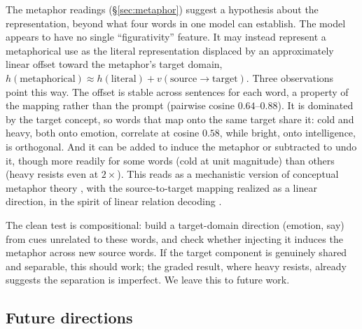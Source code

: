 \documentclass[11pt]{article}
\begin{document}
The metaphor readings (\S\ref{sec:metaphor}) suggest a hypothesis about the
representation, beyond what four words in one model can establish. The model
appears to have no single ``figurativity'' feature. It may instead represent a
metaphorical use as the literal representation displaced by an approximately
linear offset toward the metaphor's target domain, $h(\text{metaphorical})
\approx h(\text{literal}) + v(\text{source}\rightarrow\text{target})$. Three
observations point this way. The offset is stable across sentences for each word,
a property of the mapping rather than the prompt (pairwise cosine
$0.64$--$0.88$). It is dominated by the target concept, so words that map onto
the same target share it: cold and heavy, both onto emotion, correlate at cosine
$0.58$, while bright, onto intelligence, is orthogonal. And it can be added to
induce the metaphor or subtracted to undo it, though more readily for some words
(cold at unit magnitude) than others (heavy resists even at $2\times$). This
reads as a mechanistic version of conceptual metaphor theory
\citep{lakoff1980}, with the source-to-target mapping realized as a linear
direction, in the spirit of linear relation decoding \citep{hernandez2024}.

The clean test is compositional: build a target-domain direction (emotion, say)
from cues unrelated to these words, and check whether injecting it induces the
metaphor across new source words. If the target component is genuinely shared and
separable, this should work; the graded result, where heavy resists, already
suggests the separation is imperfect. We leave this to future work.

\subsection{Future directions}
\end{document}
